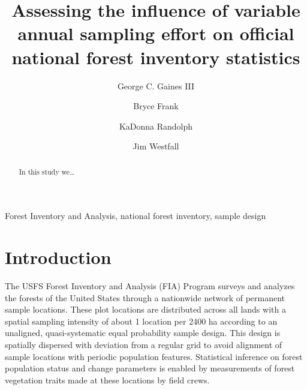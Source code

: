 \documentclass[
  number]{elsarticle}
\begin{document}
\begin{frontmatter}
\title{Assessing the influence of variable annual sampling effort on
official national forest inventory statistics}
\author[1]{George C. Gaines III%
%
}
\author[2]{Bryce Frank%
%
}

\author[3]{KaDonna Randolph%
%
}

\author[4]{Jim Westfall%
%
}







        
\begin{abstract}
In this study we\ldots{}
\end{abstract}





\begin{keyword}
    
    Forest Inventory and Analysis, national forest inventory, sample
design
\end{keyword}
\end{frontmatter}
    

\section{Introduction}\label{sec-intro}

The USFS Forest Inventory and Analysis (FIA) Program surveys and
analyzes the forests of the United States through a nationwide network
of permanent sample locations. These plot locations are distributed
across all lands with a spatial sampling intensity of about 1 location
per 2400 ha according to an unaligned, quasi-systematic equal
probability sample design. This design is spatially dispersed with
deviation from a regular grid to avoid alignment of sample locations
with periodic population features. Statistical inference on forest
population status and change parameters is enabled by measurements of
forest vegetation traits made at these locations by field crews.
\end{document}
